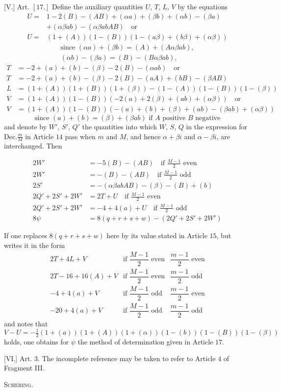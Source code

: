 [V.] Art. $[17.]$ Define the auxiliary quantities $U$, $T$, $L$, $V$ by the equations
\[
\begin{aligned}
U={}&1-2(B)-(AB)+(\alpha a)+(\beta b)+(\alpha b)-(\beta a)\\
&+(\alpha\beta ab)-(\alpha\beta abAB)\quad\text{or}\\
U={}&(1+(A))(1-(B))(1-(a\beta)+(b\beta)+(\alpha\beta))
\end{aligned}
\]
\[
\begin{gathered}
\text{since }(\alpha a)+(\beta b)=(A)+(A\alpha\beta ab),\\
(\alpha b)-(\beta a)=(B)-(B\alpha\beta ab)\text{},
\end{gathered}
\]
\[
\begin{aligned}
T&=-2+(a)+(b)-(\beta)-2(B)-(\alpha ab)\quad\text{or}\\
T&=-2+(a)+(b)-(\beta)-2(B)-(aA)+(bB)-(\beta AB)\\
L&=(1+(A))(1+(B))(1+(\beta))-(1-(A))(1-(B))(1-(\beta))\\
V&=(1+(A))(1-(B))(-2(a)+2(\beta)+(ab)+(\alpha\beta))\quad\text{or}\\
V&=(1+(A))(1-(B))(-(a)+(b)+(\beta)+(ab)-(\beta ab)+(\alpha\beta))
\end{aligned}
\]
\[
\text{since }(a)+(b)=(\beta)+(\beta ab)\text{ if }A\text{ positive }B\text{ negative}
\]
and denote by $W'$, $S'$, $Q'$ the quantities into which $W$, $S$, $Q$ in the expression for $\mathrm{Dec.}\frac mM$ in Article $14$ pass when $m$ and $M$, and hence $\alpha+\beta i$ and $\alpha-\beta i$, are interchanged. Then

\[
\begin{aligned}
2W'&=-5(B)-(AB)\quad\text{if }\frac{M-1}{2}\text{ even}\\
2W'&=-(B)-(AB)\quad\text{if }\frac{M-1}{2}\text{ odd}\\
2S'&=-(\alpha\beta abAB)-(\beta)-(B)+(b)\\
2Q'+2S'+2W'&=2T+U\quad\text{if }\frac{M-1}{2}\text{ even}\\
2Q'+2S'+2W'&=-4+4(a)+U\quad\text{if }\frac{M-1}{2}\text{ odd}\\
8\psi&=8(q+r+s+w)-(2Q'+2S'+2W')
\end{aligned}
\]

If one replaces $8(q+r+s+w)$ here by its value stated in Article $15$, but writes it in the form
\[
\begin{array}{lll}
2T+4L+V&\text{if }\dfrac{M-1}{2}\text{ even}&\dfrac{m-1}{2}\text{ even}\\[4pt]
2T-16+16(A)+V&\text{if }\dfrac{M-1}{2}\text{ even}&\dfrac{m-1}{2}\text{ odd}\\[4pt]
-4+4(a)+V&\text{if }\dfrac{M-1}{2}\text{ odd}&\dfrac{m-1}{2}\text{ even}\\[4pt]
-20+4(a)+V&\text{if }\dfrac{M-1}{2}\text{ odd}&\dfrac{m-1}{2}\text{ odd}
\end{array}
\]
and notes that
\[
V-U=-\tfrac12(1+(a))(1+(A))(1+(\alpha))(1-(b))(1-(B))(1-(\beta))
\]
holds, one obtains for $\psi$ the method of determination given in Article $17$.

[VI.] Art. $3$. The incomplete reference may be taken to refer to Article $4$ of Fragment III.
\begin{flushright}\textsc{Schering.}\end{flushright}
